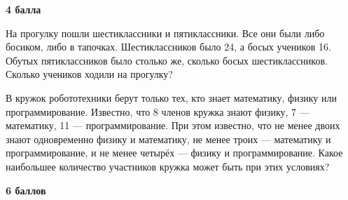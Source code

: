\begin{flushright} \textbf{4 балла}\\ 
\end{flushright}

\hspace{3mm}

 На прогулку пошли шестиклассники и пятиклассники. Все они были либо
босиком, либо в тапочках. Шестиклассников было 24, а босых учеников 16.
Обутых пятиклассников было столько же, сколько босых шестиклассников.
Сколько учеников ходили на прогулку? 

 В кружок робототехники берут только тех, кто знает математику, физику или программирование. Известно, что 8 членов кружка
знают физику, 7 — математику, 11 — программирование. При этом известно, что не менее двоих
знают одновременно физику и математику, не менее троих — математику и программирование,
и не менее четырёх — физику и программирование. Какое наибольшее количество участников
кружка может быть при этих условиях?

\begin{flushright} \textbf{6 баллов}\\ 
\end{flushright}